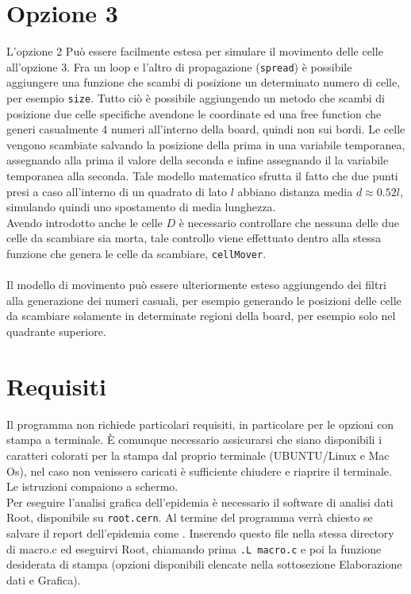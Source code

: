 \documentclass[a4paper]{article}
\begin{document}
\section{Opzione 3}
L'opzione 2 Può essere facilmente estesa per simulare il movimento delle celle all'opzione 3. Fra un loop e l'altro di propagazione (\texttt{spread}) è possibile aggiungere una funzione che scambi di posizione un determinato numero di celle, per esempio \texttt{size}. Tutto ciò è possibile aggiungendo un metodo che scambi di posizione due celle specifiche avendone le coordinate ed una free function che generi casualmente 4 numeri all'interno della board, quindi non sui bordi. Le celle vengono scambiate salvando la posizione della prima in una variabile temporanea, assegnando alla prima il valore della seconda e infine assegnando il la variabile temporanea alla seconda. Tale modello matematico sfrutta il fatto che due punti presi a caso all'interno di un quadrato di lato $l$ abbiano distanza media $d \approx 0.52l$, simulando quindi uno spostamento di media lunghezza.\\
Avendo introdotto anche le celle $D$ è necessario controllare che nessuna delle due celle da scambiare sia morta, tale controllo viene effettuato dentro alla stessa funzione che genera le celle da scambiare, \texttt{cellMover}.\\ \\
Il modello di movimento può essere ulteriormente esteso aggiungendo dei filtri alla generazione dei numeri casuali, per esempio generando le posizioni delle celle da scambiare solamente in determinate regioni della board, per esempio solo nel quadrante superiore.\\

\section{Requisiti}
Il programma non richiede particolari requisiti, in particolare per le opzioni con stampa a terminale. \`E comunque necessario assicurarsi che siano disponibili i caratteri colorati per la stampa dal proprio terminale (UBUNTU/Linux e Mac Os), nel caso non venissero caricati è sufficiente chiudere e riaprire il terminale.\\
Le istruzioni compaiono a schermo.\\
Per eseguire l'analisi grafica dell'epidemia è necessario il software di analisi dati Root, disponibile su \texttt{root.cern}.
Al termine del programma verrà chiesto se salvare il report dell'epidemia come . Inserendo questo file nella stessa directory di macro.c ed eseguirvi Root, chiamando prima \texttt{.L macro.c} e poi la funzione desiderata di stampa (opzioni disponibili elencate nella sottosezione Elaborazione dati e Grafica).
\end{document}
